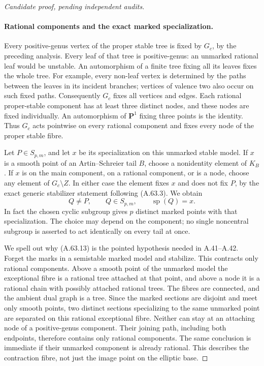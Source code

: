 \begin{proof}[Candidate proof, pending independent audits]
\paragraph{Rational components and the exact marked specialization.}
Every positive-genus vertex of the proper stable tree is
fixed by \(G_c\), by the preceding analysis. Every leaf
of that tree is positive-genus: an unmarked rational leaf
would be unstable. An automorphism of a finite tree fixing
all its leaves fixes the whole tree. For example, every
non-leaf vertex is determined by the paths between the
leaves in its incident branches; vertices of valence two
also occur on such fixed paths. Consequently \(G_c\)
fixes all vertices and edges. Each rational proper-stable
component has at least three distinct nodes, and these
nodes are fixed individually. An automorphism of
\(\mathbf P^1\) fixing three points is the identity.
Thus \(G_c\) acts pointwise on every rational component
and fixes every node of the proper stable fibre.

Let \(P\in S_{p,m}\), and let \(x\) be its specialization
on this unmarked stable model. If \(x\) is a smooth point
of an Artin--Schreier tail \(B\), choose a nonidentity
element of \(K_B\). If \(x\) is on the main component,
on a rational component, or is a node, choose any element
of \(G_c\setminus Z\). In either case the element fixes
\(x\) and does not fix \(P\), by the exact generic
stabilizer statement following (A.63.3). We obtain
\[
                    Q\ne P,\qquad Q\in S_{p,m},
                    \qquad \operatorname{sp}(Q)=x.
                                                        \tag{A.63.13}
\]
In fact the chosen cyclic subgroup gives \(p\) distinct
marked points with that specialization. The choice may
depend on the component; no single noncentral subgroup is
asserted to act identically on every tail at once.

We spell out why (A.63.13) is the pointed hypothesis
needed in A.41--A.42. Forget the marks in a semistable
marked model and stabilize. This contracts only rational
components. Above a smooth point of the unmarked model
the exceptional fibre is a rational tree attached at that
point, and above a node it is a rational chain with
possibly attached rational trees. The fibres are
connected, and the ambient dual graph is a tree. Since
the marked sections are disjoint and meet only smooth
points, two distinct sections specializing to the same
unmarked point are separated on this rational exceptional
fibre. Neither can stay at an attaching node of a
positive-genus component. Their joining path, including
both endpoints, therefore contains only rational
components. The same conclusion is immediate if their
unmarked component is already rational. This describes
the contraction fibre, not just the image point on the
elliptic base.


\end{proof}
